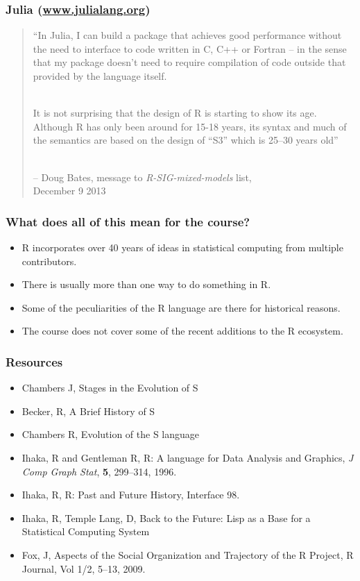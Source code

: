 \documentclass[svgnames]{beamer}
\begin{document}
\begin{frame}
  \frametitle{Julia (\url{www.julialang.org})}

  \begin{quote}
    ``In Julia, I can build a package that achieves good performance
    without the need to interface to code written in C, C++ or Fortran --
    in the sense that my package doesn't need to require compilation of
    code outside that provided by the language itself.

    ~\\
    
    It is not surprising that the design of R is starting to show its
    age. Although R has only been around for 15-18 years, its syntax
    and much of the semantics are based on the design of ``S3'' which
    is 25--30 years old''

    ~\\
    
    -- Doug Bates, message to {\em R-SIG-mixed-models} list,\\
    December 9 2013
  \end{quote}
  
\end{frame}

\begin{frame}
  \frametitle{What does all of this mean for the course?}

  \begin{itemize}
  \item R incorporates over 40 years of ideas in statistical computing
    from multiple contributors.
  \item There is usually more than one way to do something in R.
  \item Some of the peculiarities of the R language are there for
    historical reasons.
  \item The course does not cover some of the recent additions to the
    R ecosystem.
  \end{itemize}

\end{frame}
    
\begin{frame}
  \frametitle{Resources}

  \begin{itemize}
  \item Chambers J, Stages in the Evolution of S
  \item Becker, R, A Brief History of S
  \item Chambers R, Evolution of the S language
  \item Ihaka, R and Gentleman R, R: A language for Data Analysis and Graphics,
    {\em J Comp Graph Stat}, {\bf 5}, 299--314, 1996.
  \item Ihaka, R, R: Past and Future History, Interface 98.
  \item Ihaka, R, Temple Lang, D, Back to the Future: Lisp as a Base for a
    Statistical Computing System
  \item Fox, J, Aspects of the Social Organization and Trajectory of
    the R Project, R Journal, Vol 1/2, 5--13, 2009.
  \end{itemize}

\end{frame}
\end{document}

